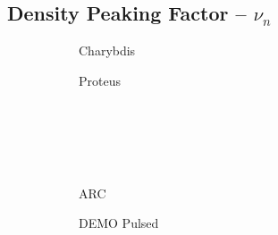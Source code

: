 \clearpage

\newpage

\subsection*{ Density Peaking Factor -- $\nu_n$ }
  \label{subsection:sensitivity_nu_n}

\begin{figure*}[h!]
    \centering
    \hfill
    \begin{subfigure}[t]{0.45\textwidth}
        \centering
    \begin{adjustbox}{width=\textwidth}
      \Large
      
    \end{adjustbox}
        \caption{Charybdis}
    \end{subfigure}
    \hfill
    \begin{subfigure}[t]{0.45\textwidth}
        \centering
    \begin{adjustbox}{width=\textwidth}
      \Large
      
    \end{adjustbox}
        \caption{Proteus}
    \end{subfigure}
    \hfill \hfill ~\\ ~\\ ~\\ ~\\
    \hfill
    \begin{subfigure}[t]{0.45\textwidth}
        \centering
    \begin{adjustbox}{width=\textwidth}
      \Large
      
    \end{adjustbox}
        \caption{ARC}
    \end{subfigure}
    \hfill
    \begin{subfigure}[t]{0.45\textwidth}
        \centering
    \begin{adjustbox}{width=\textwidth}
      \Large
      
    \end{adjustbox}
        \caption{DEMO Pulsed}
    \end{subfigure}
    \hfill \hfill ~\\ ~\\ ~\\ ~\\
    \hfill
    \begin{subfigure}[t]{0.45\textwidth}
        \centering
    \begin{adjustbox}{width=\textwidth}

\end{adjustbox}
\end{subfigure}
\end{figure*}
